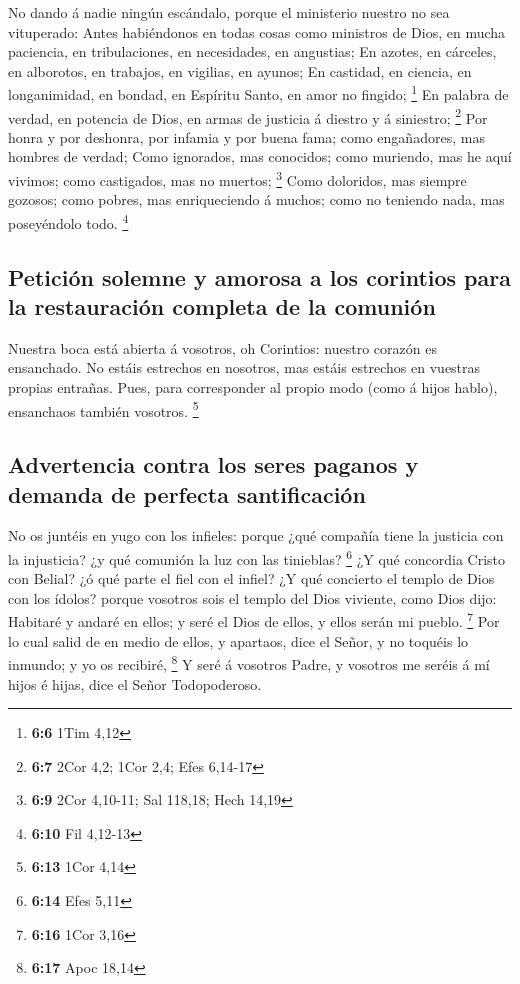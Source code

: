  No dando á nadie ningún escándalo, porque el ministerio
nuestro no sea vituperado:  Antes habiéndonos en todas
cosas como ministros de Dios, en mucha paciencia, en tribulaciones, en
necesidades, en angustias;  En azotes, en cárceles, en
alborotos, en trabajos, en vigilias, en ayunos;  En
castidad, en ciencia, en longanimidad, en bondad, en Espíritu Santo, en
amor no fingido; \footnote{\textbf{6:6} 1Tim 4,12}  En
palabra de verdad, en potencia de Dios, en armas de justicia á diestro y
á siniestro; \footnote{\textbf{6:7} 2Cor 4,2; 1Cor 2,4; Efes 6,14-17}
 Por honra y por deshonra, por infamia y por buena fama;
como engañadores, mas hombres de verdad;  Como ignorados,
mas conocidos; como muriendo, mas he aquí vivimos; como castigados, mas
no muertos; \footnote{\textbf{6:9} 2Cor 4,10-11; Sal 118,18; Hech 14,19}
 Como doloridos, mas siempre gozosos; como pobres, mas
enriqueciendo á muchos; como no teniendo nada, mas poseyéndolo todo.
\footnote{\textbf{6:10} Fil 4,12-13}

\hypertarget{peticiuxf3n-solemne-y-amorosa-a-los-corintios-para-la-restauraciuxf3n-completa-de-la-comuniuxf3n}{%
\subsection{Petición solemne y amorosa a los corintios para la
restauración completa de la
comunión}\label{peticiuxf3n-solemne-y-amorosa-a-los-corintios-para-la-restauraciuxf3n-completa-de-la-comuniuxf3n}}

 Nuestra boca está abierta á vosotros, oh Corintios:
nuestro corazón es ensanchado.  No estáis estrechos en
nosotros, mas estáis estrechos en vuestras propias entrañas.
 Pues, para corresponder al propio modo (como á hijos
hablo), ensanchaos también vosotros. \footnote{\textbf{6:13} 1Cor 4,14}

\hypertarget{advertencia-contra-los-seres-paganos-y-demanda-de-perfecta-santificaciuxf3n}{%
\subsection{Advertencia contra los seres paganos y demanda de perfecta
santificación}\label{advertencia-contra-los-seres-paganos-y-demanda-de-perfecta-santificaciuxf3n}}

 No os juntéis en yugo con los infieles: porque ¿qué
compañía tiene la justicia con la injusticia? ¿y qué comunión la luz con
las tinieblas? \footnote{\textbf{6:14} Efes 5,11}  ¿Y qué
concordia Cristo con Belial? ¿ó qué parte el fiel con el infiel?
 ¿Y qué concierto el templo de Dios con los ídolos?
porque vosotros sois el templo del Dios viviente, como Dios dijo:
Habitaré y andaré en ellos; y seré el Dios de ellos, y ellos serán mi
pueblo. \footnote{\textbf{6:16} 1Cor 3,16}  Por lo cual
salid de en medio de ellos, y apartaos, dice el Señor, y no toquéis lo
inmundo; y yo os recibiré, \footnote{\textbf{6:17} Apoc 18,14}
 Y seré á vosotros Padre, y vosotros me seréis á mí hijos
é hijas, dice el Señor Todopoderoso.

